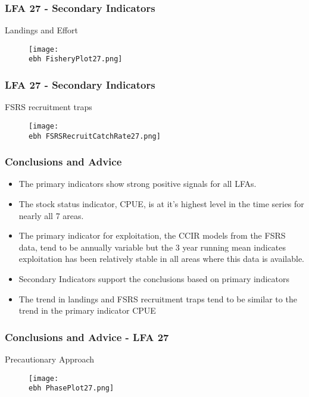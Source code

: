 \documentclass{beamer}
\newcommand{\ebh}{\string~/bio.data/bio.lobster/figures/Assessment/LFA2732/} %
\begin{document}
\begin{frame}
\frametitle{LFA 27 - Secondary Indicators}
Landings and Effort
\begin{figure}
        \begin{center}
            \texttt{[image: \\ebh FisheryPlot27.png]}
        \end{center}
    \end{figure}
\end{frame}



\begin{frame}
\frametitle{LFA 27 - Secondary Indicators}
FSRS recruitment traps
\begin{figure}
        \begin{center}
            \texttt{[image: \\ebh FSRSRecruitCatchRate27.png]}
        \end{center}
    \end{figure}
\end{frame}




\begin{frame}
\frametitle{Conclusions and Advice}
\begin{itemize}

\item The primary indicators show strong positive signals for all LFAs. 
\item The stock status indicator, CPUE, is at it’s highest level in the time series for nearly all 7 areas. 
\item The primary indicator for exploitation, the CCIR models from the FSRS data, tend to be annually variable but the 3 year running mean indicates exploitation has been relatively stable in all areas where this data is available. 
\item Secondary Indicators support the conclusions based on primary indicators
\item The trend in landings and FSRS recruitment traps tend to be similar to the trend in the primary indicator CPUE
\end{itemize}
\end{frame}





\begin{frame}
\frametitle{Conclusions and Advice - LFA 27}
Precautionary Approach
\begin{figure}
        \begin{center}
            \texttt{[image: \\ebh PhasePlot27.png]}
        \end{center}
    \end{figure}
\end{frame}
\end{document}
